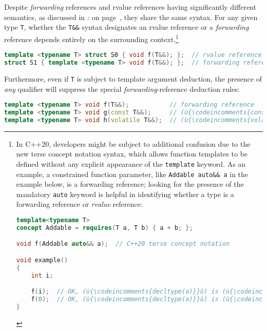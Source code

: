 Despite \emph{forwarding} references and rvalue
references having significantly different semantics, as discussed in \textit{: } on page~\pageref{identifying-forwarding-references}, they share the same syntax. For any given type \texttt{T},
whether the \texttt{T\&\&} syntax designates an rvalue
reference or a \emph{forwarding} reference depends entirely on the
surrounding context.{\cprotect\footnote{In C++20, developers might be
subject to additional confusion due to the new terse concept notation
syntax, which allows function templates to be defined without any
explicit appearance of the \texttt{template} keyword. As an example, a
constrained function parameter, like
\texttt{Addable}~\texttt{auto\&\&}~\texttt{a} in the example below, is a forwarding
reference; looking for the presence of the mandatory \texttt{auto}
keyword is helpful in identifying whether a type is a forwarding
reference or \emph{rvalue} reference:

\begin{lstlisting}[language=C++, basicstyle={\ttfamily\footnotesize}]
template<typename T>
concept Addable = requires(T a, T b) { a + b; };

void f(Addable auto&& a);  // C++20 terse concept notation

void example()
{
    int i;

    f(i);  // OK, (ù{\codeincomments{decltype(a)}}ù) is (ù{\codeincomments{int\&}}ù) in (ù{\codeincomments{f}}ù).
    f(0);  // OK, (ù{\codeincomments{decltype(a)}}ù) is (ù{\codeincomments{int\&\&}}ù) in (ù{\codeincomments{f}}ù).
}
\end{lstlisting}
      }}

\begin{lstlisting}[language=C++]
template <typename T> struct S0 { void f(T&&); };  // rvalue reference
struct S1 { template <typename T> void f(T&&); };  // forwarding reference
\end{lstlisting}
    
\noindent Furthermore, even if \texttt{T} is subject to template argument
deduction, the presence of \emph{any} qualifier will suppress the
special \emph{forwarding}-reference deduction rules:

\begin{lstlisting}[language=C++]
template <typename T> void f(T&&);           // forwarding reference
template <typename T> void g(const T&&);     // (ù{\codeincomments{const}}ù) rvalue reference
template <typename T> void h(volatile T&&);  // (ù{\codeincomments{volatile}}ù) rvalue reference
\end{lstlisting}
    
